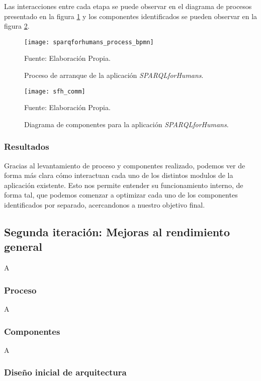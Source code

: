 Las interacciones entre cada etapa se puede observar en el diagrama de procesos presentado en la figura \ref{fig:sfh-bpmn} y los componentes identificados se pueden observar en la figura \ref{fig:sfh-componentes}.

\begin{figure}[ht]
    \centering
    \texttt{[image: sparqforhumans\_process\_bpmn]}
    \caption{Proceso de arranque de la aplicación \textit{SPARQLforHumans}.}Fuente: Elaboración Propia.
    \label{fig:sfh-bpmn}
\end{figure}

\begin{figure}
    \centering
    \texttt{[image: sfh\_comm]}
    \caption{Diagrama de componentes para la aplicación \textit{SPARQLforHumans}.}Fuente: Elaboración Propia.
    \label{fig:sfh-componentes}
\end{figure}

\subsubsection*{Resultados}

Gracias al levantamiento de proceso y componentes realizado, podemos ver de forma más clara cómo interactuan cada uno de los distintos modulos de la aplicación existente. Esto nos permite entender su funcionamiento interno, de forma tal, que podemos comenzar a optimizar cada uno de los componentes identificados por separado, acercandonos a nuestro objetivo final.

\subsection{Segunda iteración: Mejoras al rendimiento general}

A

\subsubsection*{Proceso}

A

\subsubsection*{Componentes}

A

\subsubsection*{Diseño inicial de arquitectura}

